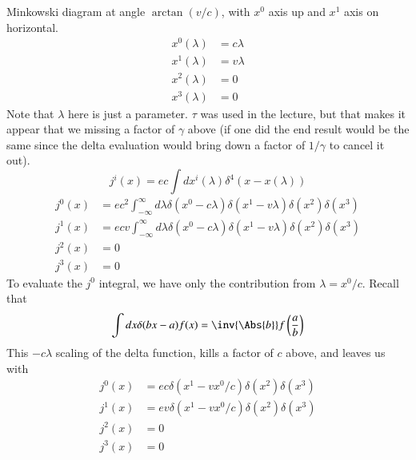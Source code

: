 Minkowski diagram at angle \(\arctan(v/c)\), with \(x^0\) axis up and \(x^1\) axis on horizontal.
%
\begin{equation}\label{eqn:relativisticElectrodynamicsL12b:450}
\begin{aligned}
x^0(\lambda) &= c \lambda \\
x^1(\lambda) &= v \lambda \\
x^2(\lambda) &= 0 \\
x^3(\lambda) &= 0
\end{aligned}
\end{equation}
%
Note that \(\lambda\) here is just a parameter.  \(\tau\) was used in the lecture, but that makes it appear that we missing a factor of \(\gamma\) above (if one did the end result would be the same since the delta evaluation would bring down a factor of \(1/\gamma\) to cancel it out).
%
\begin{equation}\label{eqn:relativisticElectrodynamicsL12b:470}
j^i(x) = e c \int dx^i(\lambda) \delta^4 (x - x(\lambda))
\end{equation}
%
\begin{equation}\label{eqn:relativisticElectrodynamicsL12b:490}
\begin{aligned}
j^0(x) &= e c^2  \int_{-\infty}^\infty d\lambda \delta(x^0 -  c \lambda) \delta(x^1 -  v \lambda) \delta(x^2) \delta(x^3) \\
j^1(x) &= e c v  \int_{-\infty}^\infty d\lambda \delta(x^0 -  c \lambda) \delta(x^1 -  v \lambda) \delta(x^2) \delta(x^3) \\
j^2(x) &= 0 \\
j^3(x) &= 0
\end{aligned}
\end{equation}
%
To evaluate the \(j^0\) integral, we have only the contribution from \(\lambda = x^0/ c\).  Recall that
%
\begin{equation}\label{eqn:relativisticElectrodynamicsL12b:510}
\int dx \delta( b x - a) f(x) = \inv{\Abs{b}} f\left( \frac{a}{b} \right)
\end{equation}
%
This \(- c\lambda\) scaling of the delta function, kills a factor of \(c \) above, and leaves us with
%
\begin{equation}\label{eqn:relativisticElectrodynamicsL12b:530}
\begin{aligned}
j^0(x) &= e c \delta(x^1 - v x^0/c) \delta(x^2) \delta(x^3) \\
j^1(x) &= e v \delta(x^1 - v x^0/c) \delta(x^2) \delta(x^3) \\
j^2(x) &= 0 \\
j^3(x) &= 0
\end{aligned}
\end{equation}
